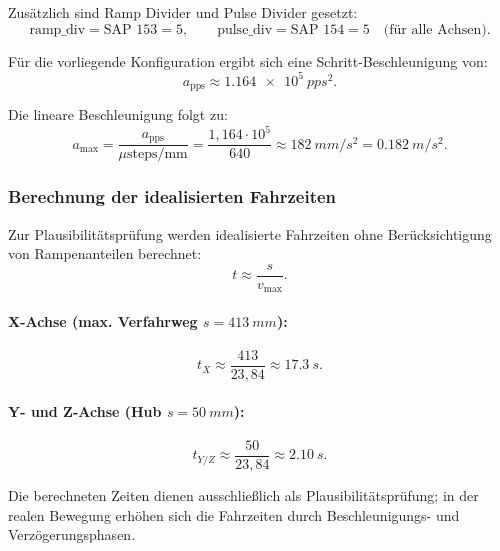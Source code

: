Zusätzlich sind Ramp Divider und Pulse Divider gesetzt:
\begin{equation}
\text{ramp\_div}=\text{SAP 153}=5,\qquad
\text{pulse\_div}=\text{SAP 154}=5
\quad \text{(für alle Achsen)}.
\end{equation}

Für die vorliegende Konfiguration ergibt sich eine Schritt-Beschleunigung von:
\begin{equation}
a_\text{pps} \approx \SI{1,164e5}{pps^2}.
\end{equation}

Die lineare Beschleunigung folgt zu:
\begin{equation}
a_{\max}=\frac{a_\text{pps}}{\mu\text{steps/mm}}
=\frac{1,164\cdot 10^5}{640}
\approx \SI{182}{mm/s^2}
=\SI{0,182}{m/s^2}.
\end{equation}

\subsubsection{Berechnung der idealisierten Fahrzeiten}

Zur Plausibilitätsprüfung werden idealisierte Fahrzeiten ohne Berücksichtigung von Rampenanteilen berechnet:
\begin{equation}
t \approx \frac{s}{v_{\max}}.
\end{equation}

\paragraph{X-Achse (max. Verfahrweg $s=\SI{413}{mm}$):}
\begin{equation}
t_X \approx \frac{413}{23,84}\approx \SI{17,3}{s}.
\end{equation}

\paragraph{Y- und Z-Achse (Hub $s=\SI{50}{mm}$):}
\begin{equation}
t_{Y/Z} \approx \frac{50}{23,84}\approx \SI{2,10}{s}.
\end{equation}

Die berechneten Zeiten dienen ausschließlich als Plausibilitätsprüfung; in der realen Bewegung erhöhen sich die
Fahrzeiten durch Beschleunigungs- und Verzögerungsphasen.

